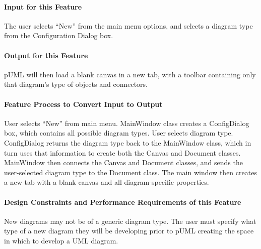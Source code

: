 \documentclass[twoside,letterpaper]{article}
\begin{document}
{\paragraph[Input for this Feature]{Input for this Feature}
{
The user selects ``New'' from the main menu options, and selects a diagram type from the Configuration Dialog box. 
}

\paragraph{Output for this Feature}
{
pUML will then load a blank canvas in a new tab, with a toolbar containing only that diagram's type of objects and connectors.
}

\paragraph{Feature Process to Convert Input to Output}
{
User selects ``New'' from main menu. MainWindow class creates a ConfigDialog box, which contains all possible diagram types. User selects diagram type. ConfigDialog returns the diagram type back to the MainWindow class, which in turn uses that information to create both the Canvas and Document classes. MainWindow then connects the Canvas and Document classes, and sends the user-selected diagram type to the Document class. The main window then creates a new tab with a blank canvas and all diagram-specific properties.
}

\paragraph{Design Constraints and Performance Requirements of this Feature}
{
 New diagrams may not be of a generic diagram type. The user must specify what type of a new diagram they will be developing prior to pUML creating the space in which to develop a UML diagram.
}
\bigskip

}
\end{document}

